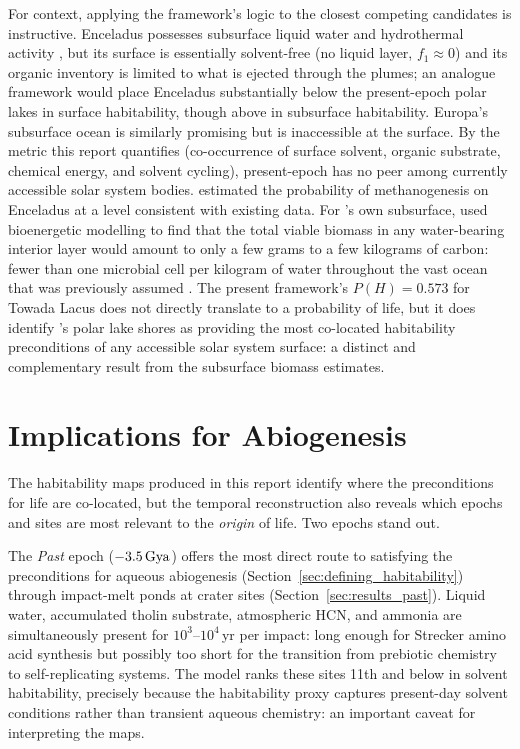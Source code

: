 For context, applying the framework's logic to the closest competing candidates is instructive.  Enceladus possesses subsurface liquid water and hydrothermal activity \citep{Waite2017}, but its surface is essentially solvent-free (no liquid layer, $f_1 \approx 0$) and its organic inventory is limited to what is ejected through the plumes; an analogue framework would place Enceladus substantially below the present-epoch \titan{} polar lakes in surface habitability, though above \titan{} in subsurface habitability.  Europa's subsurface ocean is similarly promising \citep{Hendrix2019} but is inaccessible at the surface.  By the metric this report quantifies (co-occurrence of surface solvent, organic substrate, chemical energy, and solvent cycling), present-epoch \titan{} has no peer among currently accessible solar system bodies.  \citet{Affholder2021} estimated the probability of methanogenesis on Enceladus at a level consistent with existing data.  For \titan{}'s own subsurface, \citet{Affholder2025} used bioenergetic modelling to find that the total viable biomass in any water-bearing interior layer would amount to only a few grams to a few kilograms of carbon: fewer than one microbial cell per kilogram of water throughout the vast ocean that was previously assumed \citep{Neish2024b}.  The present framework's $P(H) = 0.573$ for Towada Lacus does not directly translate to a probability of life, but it does identify \titan{}'s polar lake shores as providing the most co-located habitability preconditions of any accessible solar system surface: a distinct and complementary result from the subsurface biomass estimates.

\section{Implications for Abiogenesis}
\label{sec:abiogenesis}

The habitability maps produced in this report identify where the preconditions for life are co-located, but the temporal reconstruction also reveals which epochs and sites are most relevant to the \textit{origin} of life.  Two epochs stand out.

The \textit{Past} epoch ($-3.5\,\text{Gya}$) offers the most direct route to satisfying the preconditions for aqueous abiogenesis (Section~\ref{sec:defining_habitability}) through impact-melt ponds at crater sites (Section~\ref{sec:results_past}).  Liquid water, accumulated tholin substrate, atmospheric HCN, and ammonia are simultaneously present for $10^3$--$10^4$\,yr per impact: long enough for Strecker amino acid synthesis \citep{Neish2010} but possibly too short for the transition from prebiotic chemistry to self-replicating systems.  The model ranks these sites 11th and below in solvent habitability, precisely because the habitability proxy captures present-day solvent conditions rather than transient aqueous chemistry: an important caveat for interpreting the maps.

